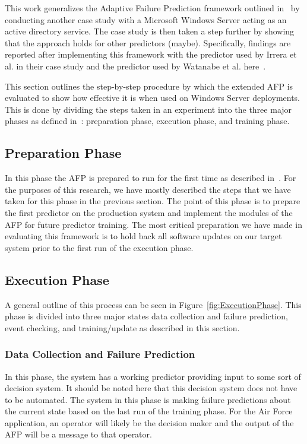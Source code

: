 This work generalizes the Adaptive Failure Prediction framework outlined
in~\cite{irrera2015} by conducting another case study with a Microsoft Windows
Server acting as an active directory service.  The case study is then taken a
step further by showing that the approach holds for other predictors (maybe).
Specifically, findings are reported after implementing this framework with
the predictor used by Irrera et al. in their case study and the predictor used
by Watanabe et al. here~\cite{watanabe2014}.

This section outlines the step-by-step procedure by which the extended AFP is
evaluated to show how effective it is when used on Windows Server deployments.
This is done by dividing the steps taken in an experiment into the three major
phases as defined in~\cite{irrera2015}: preparation phase, execution phase, and
training phase.

\subsection{Preparation Phase}
In this phase the AFP is prepared to run for the first time as described
in~\cite{irrera2015}.  For the purposes of this research, we have mostly
described the steps that we have taken for this phase in the previous section.
The point of this phase is to prepare the first predictor on the production
system and implement the modules of the AFP for future predictor training.  The
most critical preparation we have made in evaluating this framework is to hold
back all software updates on our target system prior to the first run of the
execution phase.

\subsection{Execution Phase}
A general outline of this process can be seen in
Figure~\ref{fig:ExecutionPhase}.  This phase is divided into three major states
data collection and failure prediction, event checking, and training/update as
described in this section.

\figExecutionPhase

\subsubsection{Data Collection and Failure Prediction}
In this phase, the system has a working predictor providing input to some sort
of decision system.  It should be noted here that this decision system does not
have to be automated.  The system in this phase is making failure predictions
about the current state based on the last run of the training phase.  For the
Air Force application, an operator will likely be the decision maker and the
output of the AFP will be a message to that operator.  

